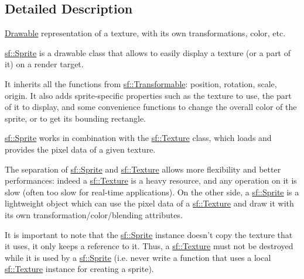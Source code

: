 \subsection{Detailed Description}
\hyperlink{classsf_1_1_drawable}{Drawable} representation of a texture, with its own transformations, color, etc. 

\hyperlink{classsf_1_1_sprite}{sf\-::\-Sprite} is a drawable class that allows to easily display a texture (or a part of it) on a render target.

It inherits all the functions from \hyperlink{classsf_1_1_transformable}{sf\-::\-Transformable}\-: position, rotation, scale, origin. It also adds sprite-\/specific properties such as the texture to use, the part of it to display, and some convenience functions to change the overall color of the sprite, or to get its bounding rectangle.

\hyperlink{classsf_1_1_sprite}{sf\-::\-Sprite} works in combination with the \hyperlink{classsf_1_1_texture}{sf\-::\-Texture} class, which loads and provides the pixel data of a given texture.

The separation of \hyperlink{classsf_1_1_sprite}{sf\-::\-Sprite} and \hyperlink{classsf_1_1_texture}{sf\-::\-Texture} allows more flexibility and better performances\-: indeed a \hyperlink{classsf_1_1_texture}{sf\-::\-Texture} is a heavy resource, and any operation on it is slow (often too slow for real-\/time applications). On the other side, a \hyperlink{classsf_1_1_sprite}{sf\-::\-Sprite} is a lightweight object which can use the pixel data of a \hyperlink{classsf_1_1_texture}{sf\-::\-Texture} and draw it with its own transformation/color/blending attributes.

It is important to note that the \hyperlink{classsf_1_1_sprite}{sf\-::\-Sprite} instance doesn't copy the texture that it uses, it only keeps a reference to it. Thus, a \hyperlink{classsf_1_1_texture}{sf\-::\-Texture} must not be destroyed while it is used by a \hyperlink{classsf_1_1_sprite}{sf\-::\-Sprite} (i.\-e. never write a function that uses a local \hyperlink{classsf_1_1_texture}{sf\-::\-Texture} instance for creating a sprite).

